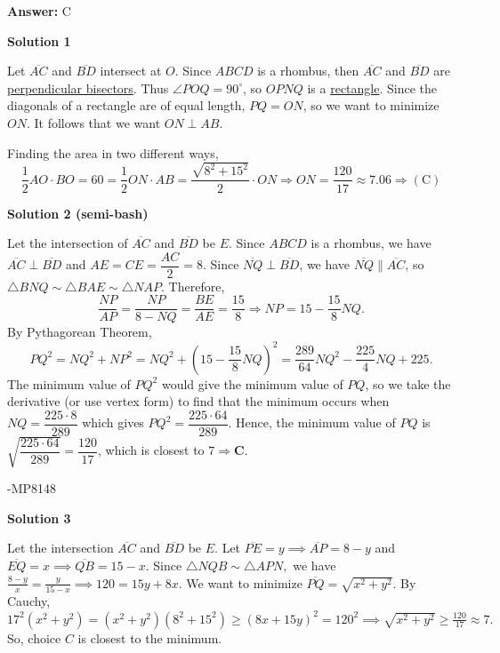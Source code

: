 \begin{enumerate}
 \textbf{Answer: }C



\textbf{Solution 1}

Let $\overline{AC}$ and $\overline{BD}$ intersect at $O$. Since $ABCD$ is a rhombus, then $\overline{AC}$ and $\overline{BD}$ are \href{https://artofproblemsolving.com/wiki/index.php?title=Perpendicular\_bisector}{perpendicular bisectors}. Thus $\angle POQ = 90^{\circ}$, so $OPNQ$ is a \href{https://artofproblemsolving.com/wiki/index.php?title=Rectangle}{rectangle}. Since the diagonals of a rectangle are of equal length, $PQ = ON$, so we want to minimize $ON$. It follows that we want $ON \perp AB$.

 Finding the area in two different ways,
 \[\frac{1}{2}   AO \cdot BO = 60 = \frac{1}{2} ON \cdot AB = \frac{\sqrt{8^2 + 15^2}}{2} \cdot ON \Longrightarrow ON = \frac{120}{17} \approx 7.06 \Rightarrow \mathrm{(C)}\]




\textbf{Solution 2 (semi-bash)}

Let the intersection of $\overline{AC}$ and $\overline{BD}$ be $E$. Since $ABCD$ is a rhombus, we have $\overline{AC} \perp \overline{BD}$ and $AE = CE = \dfrac{AC}{2} = 8$. Since $\overline{NQ} \perp \overline{BD}$, we have $\overline{NQ} \parallel \overline{AC}$, so $\triangle{BNQ} \sim \triangle{BAE} \sim \triangle{NAP}$. Therefore, 
 \[\dfrac{NP}{AP} = \dfrac{NP}{8 - NQ} = \dfrac{BE}{AE} = \dfrac{15}{8} \Rightarrow NP = 15 - \dfrac{15}{8} NQ.\] By Pythagorean Theorem, 
 \[PQ^2 = NQ^2 + NP^2 = NQ^2 + \left(15 - \dfrac{15}{8} NQ \right)^2 = \dfrac{289}{64} NQ^2 - \dfrac{225}{4} NQ + 225.\] The minimum value of $PQ^2$ would give the minimum value of $PQ$, so we take the derivative (or use vertex form) to find that the minimum occurs when $NQ = \dfrac{225 \cdot 8}{289}$ which gives $PQ^2 = \dfrac{225 \cdot 64}{289}$. Hence, the minimum value of $PQ$ is $\sqrt{\dfrac{225 \cdot 64}{289}} = \dfrac{120}{17}$, which is closest to $7 \Rightarrow \boxed{\textbf{C}}$.

 -MP8148

 



\textbf{Solution 3}

Let the intersection $\overline{AC}$ and $\overline{BD}$ be $E.$ Let $\overline{PE}=y \implies \overline{AP}=8-y$ and $\overline{EQ}=x \implies \overline {QB}=15-x.$ Since $\triangle NQB \sim \triangle APN,$ we have $\frac{8-y}{x}=\frac{y}{15-x} \implies 120=15y+8x.$ We want to minimize $\overline{PQ}=\sqrt{x^2+y^2}.$ By Cauchy, $17^2(x^2+y^2)=(x^2+y^2)(8^2+15^2) \ge (8x+15y)^2=120^2 \implies \sqrt{x^2+y^2} \ge \frac{120}{17} \approx 7.$ So, choice $\boxed{C}$ is closest to the minimum.


\end{enumerate}
